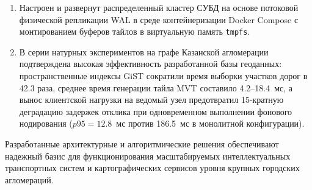 \begin{enumerate}
    \item Настроен и развернут распределенный кластер СУБД на основе потоковой физической репликации WAL в среде контейнеризации Docker Compose с монтированием буферов тайлов в виртуальную память \texttt{tmpfs}.
    \item В серии натурных экспериментов на графе Казанской агломерации подтверждена высокая эффективность разработанной базы геоданных: пространственные индексы GiST сократили время выборки участков дорог в 42.3 раза, среднее время генерации тайла MVT составило 4.2--18.4~мс, а вынос клиентской нагрузки на ведомый узел предотвратил 15-кратную деградацию задержек отклика при одновременном выполнении фонового нодирования ($p95 = 12.8$~мс против 186.5~мс в монолитной конфигурации).
\end{enumerate}

Разработанные архитектурные и алгоритмические решения обеспечивают надежный базис для функционирования масштабируемых интеллектуальных транспортных систем и картографических сервисов уровня крупных городских агломераций.
